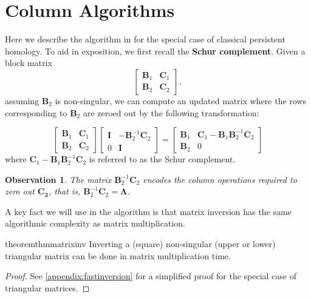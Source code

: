 \documentclass{article}
\newtheorem{observation}[theorem]{Observation}
\newcommand{\mat}[1]{\mathbf{#1}}
\begin{document}
\section{Column Algorithms}
Here we describe the algorithm in \cite{milosavljevic2011zigzag} for the special case of classical persistent homology. To aid in exposition, we first recall the \textbf{Schur complement}. Given a block matrix
\[
\begin{bmatrix}
    \mat{B}_1 & \mat{C}_1 \\
    \mat{B}_2 & \mat{C}_2
\end{bmatrix},\]
assuming $\mat{B}_2$ is non-singular, we can compute an updated matrix where the rows corresponding to $\mat{B}_2$ are zeroed out by the following transformation:

\begin{equation}\label{eq:schur}
	\begin{bmatrix}
        \mat{B}_1 & \mat{C}_1 \\
        \mat{B}_2 & \mat{C}_2
    \end{bmatrix}\begin{bmatrix} \mat{I}& -\mat{B}_2^{-1} \mat{C}_2 \\ 0 & \mat{I} \end{bmatrix} =  \begin{bmatrix} \mat{B}_1 & \mat{C}_1 - \mat{B}_1 \mat{B}^{-1}_2 \mat{C}_2 \\ \mat{B}_2& 0 \end{bmatrix}
\end{equation}
where $\mat{C}_1 - \mat{B}_1 \mat{B}^{-1}_2 \mat{C}_2$ is referred to as the Schur complement.

\begin{observation}
The matrix $\mat{B}_2^{-1}\mat{C}_2$ encodes the column operations required to zero out $\mat{C_2}$, that is, $\mat{B}_2^{-1}\mat{C}_2=\mat{\Lambda}$.
\end{observation}

A key fact we will use in the algorithm is that matrix inversion has the same algorithmic complexity as matrix multiplication. 
\begin{restatable}{theorem}{thmmatrixinv}
    \label{thm:matrix_inv}
    Inverting a (square) non-singular  (upper or lower) triangular matrix can be done in matrix multiplication time.
\end{restatable}
\begin{proof}
See \cref{appendix:fastinversion} for a simplified proof for the special case of triangular matrices.
\end{proof}
\end{document}
